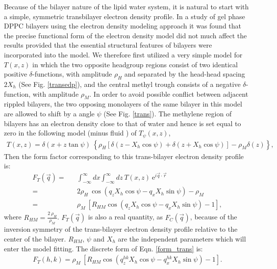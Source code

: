 Because of the bilayer nature of the lipid water system, it is natural 
to start with a simple, symmetric transbilayer electron density profile. 
In a study of gel phase DPPC bilayers using the electron
density modeling approach \cite{WSN89} it was found
that the precise functional form of the electron density model did not
much affect the results provided that the essential structural
features of bilayers were incorporated into the model.
We therefore first utilized a very simple model for $T(x,z)$ in
which the two opposite headgroup regions consist of 
two identical positive $\delta$-functions, with amplitude $\rho_H$ and
separated by the head-head spacing $2X_h$ (See Fig. \ref{transedp}), and
the central methyl trough consists of a negative $\delta$-function, with 
amplitude $\rho_M$. In order to avoid possible conflict between adjacent 
rippled bilayers, the two opposing monolayers of the same bilayer in this 
model are allowed to shift by a angle $\psi$ (See Fig. \ref{trans}).
The methylene region of bilayers has an electron density
close to that of water and hence is set equal to zero in the
following model (minus fluid \cite{WKMc73}) of $T_{\psi}(x,z)$,
\begin{eqnarray}
\label{transbi}
T(x,z) = \delta (x + z \tan \psi)\ \left\{ \rho_H [\delta (z-X_h\cos \psi)
+\delta (z+X_h \cos \psi)]-\rho_M \delta (z) \right\},
\end{eqnarray}
Then the form factor corresponding to this trans-bilayer 
electron density profile is:
\begin{eqnarray}
\label{form_trans}
F_T (\vec{q}) =&& \int_{- \infty}^{\infty} dx \int_{- \infty}^{\infty} dz
\ T(x,z) \ \mbox{e}^{i \vec{q} \cdot \vec{r}} \nonumber\\
=&& 2 \rho_H\ \cos (q_z X_h \cos \psi - q_x X_h \sin \psi) - \rho_M \nonumber\\
=&& \rho_M\ [R_{HM} \cos (q_z X_h \cos \psi - q_x X_h \sin \psi) -1],
\end{eqnarray}
where \(R_{HM} = \frac{2\ \rho_H}{ \rho_M}\). $F_T (\vec{q})$ is also
a real quantity, as $F_C (\vec{q})$, because of the inversion symmetry of the
trans-bilayer electron density profile relative to the center of the bilayer.
$R_{HM}$, $\psi$ and $X_h$ are the independent parameters which will enter
the model fitting. The discrete form of Eqn. \ref{form_trans} is:
\begin{eqnarray}
\label{dis_trans}
F_T (h,k) = \rho_M\ [R_{HM} \cos (q_z^{hk} X_h \cos \psi 
		- q_x^{hk} X_h \sin \psi) -1].
\end{eqnarray}

